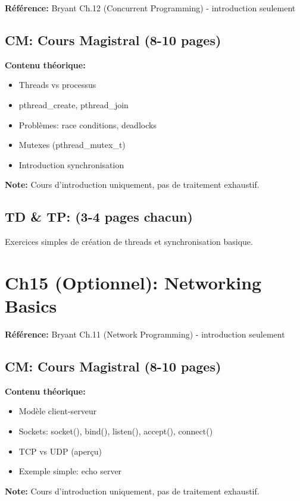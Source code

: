\documentclass[10pt,a4paper]{article}
\begin{document}
\textbf{Référence:} Bryant Ch.12 (Concurrent Programming) - introduction seulement

\subsection*{CM: Cours Magistral (8-10 pages)}

\textbf{Contenu théorique:}
\begin{itemize}
\item Threads vs processus
\item pthread\_create, pthread\_join
\item Problèmes: race conditions, deadlocks
\item Mutexes (pthread\_mutex\_t)
\item Introduction synchronisation
\end{itemize}

\textbf{Note:} Cours d'introduction uniquement, pas de traitement exhaustif.

\subsection*{TD \& TP: (3-4 pages chacun)}

Exercices simples de création de threads et synchronisation basique.

\newpage

\section{Ch15 (Optionnel): Networking Basics}

\textbf{Référence:} Bryant Ch.11 (Network Programming) - introduction seulement

\subsection*{CM: Cours Magistral (8-10 pages)}

\textbf{Contenu théorique:}
\begin{itemize}
\item Modèle client-serveur
\item Sockets: socket(), bind(), listen(), accept(), connect()
\item TCP vs UDP (aperçu)
\item Exemple simple: echo server
\end{itemize}

\textbf{Note:} Cours d'introduction uniquement, pas de traitement exhaustif.
\end{document}
